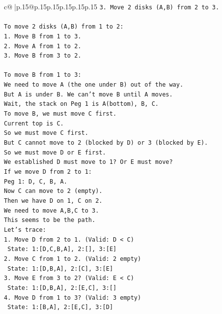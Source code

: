 \documentclass{article}
\begin{document}
{\begin{supertabular}{c@{$\;$}|p{.15\linewidth}@{}p{.15\linewidth}p{.15\linewidth}p{.15\linewidth}p{.15\linewidth}p{.15\linewidth}}
{{{\texttt{3. Move 2 disks (A,B) from 2 to 3.} \\
\\ 
\texttt{To move 2 disks (A,B) from 1 to 2:} \\
\texttt{1. Move B from 1 to 3.} \\
\texttt{2. Move A from 1 to 2.} \\
\texttt{3. Move B from 3 to 2.} \\
\\ 
\texttt{To move B from 1 to 3:} \\
\texttt{We need to move A (the one under B) out of the way.} \\
\texttt{But A is under B. We can't move B until A moves.} \\
\texttt{Wait, the stack on Peg 1 is A(bottom), B, C.} \\
\texttt{To move B, we must move C first.} \\
\texttt{Current top is C.} \\
\texttt{So we must move C first.} \\
\texttt{But C cannot move to 2 (blocked by D) or 3 (blocked by E).} \\
\texttt{So we must move D or E first.} \\
\texttt{We established D must move to 1? Or E must move?} \\
\texttt{If we move D from 2 to 1:} \\
\texttt{Peg 1: D, C, B, A.} \\
\texttt{Now C can move to 2 (empty).} \\
\texttt{Then we have D on 1, C on 2.} \\
\texttt{We need to move A,B,C to 3.} \\
\texttt{This seems to be the path.} \\
\texttt{Let's trace:} \\
\texttt{1. Move D from 2 to 1. (Valid: D < C)} \\
\texttt{   State: 1:{[}D,C,B,A{]}, 2:{[}{]}, 3:{[}E{]}} \\
\texttt{2. Move C from 1 to 2. (Valid: 2 empty)} \\
\texttt{   State: 1:{[}D,B,A{]}, 2:{[}C{]}, 3:{[}E{]}} \\
\texttt{3. Move E from 3 to 2? (Valid: E < C)} \\
\texttt{   State: 1:{[}D,B,A{]}, 2:{[}E,C{]}, 3:{[}{]}} \\
\texttt{4. Move D from 1 to 3? (Valid: 3 empty)} \\
\texttt{   State: 1:{[}B,A{]}, 2:{[}E,C{]}, 3:{[}D{]}} \\
}}}
\end{supertabular}}
\end{document}
